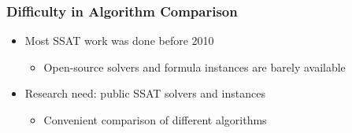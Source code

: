 \begin{frame}
      \frametitle{Difficulty in Algorithm Comparison}
      \begin{itemize}
            \item Most SSAT work was done before 2010~\cite{Majercik1998,Majercik2003,Majercik2004,Majercik2005,Majercik2007}
                  \pause
                  \begin{itemize}
                        \item Open-source solvers and formula instances are barely available
                              \pause
                  \end{itemize}
            \item \alert{Research need: public SSAT solvers and instances}
                  \pause
                  \begin{itemize}
                        \item Convenient comparison of different algorithms
                  \end{itemize}
      \end{itemize}
\end{frame}